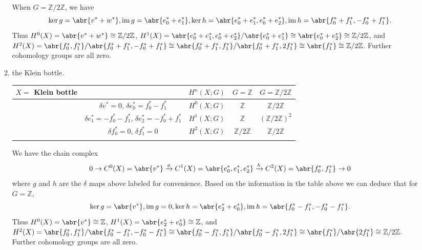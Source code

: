 \documentclass[11pt]{article}
\DeclareMathOperator{\im}{im}
\begin{document}
\begin{enumerate}
\begin{enumerate}
        When $G = \mathbb{Z}/2\mathbb{Z}$, we have \[\ker g = \abr{v^\ast + w^\ast}, \im g = \abr{e_0^\ast + e_1^\ast}, \ker h = \abr{e_0^\ast+e_1^\ast,e_0^\ast + e_2^\ast}, \im h = \abr{f_0^\ast+f_1^\ast,-f_0^\ast+f_1^\ast}.\] Thus $H^0(X) = \abr{v^\ast + w^\ast}\cong \mathbb{Z}/2\mathbb{Z}$, $H^1(X) = \abr{e_0^\ast+e_1^\ast,e_0^\ast + e_2^\ast}/\abr{e_0^\ast + e_1^\ast} \cong \abr{e_0^\ast + e_2^\ast}\cong \mathbb{Z}/2\mathbb{Z}$, and $H^2(X) = \abr{f_0^\ast, f_1^\ast}/\abr{f_0^\ast+f_1^\ast,-f_0^\ast+f_1^\ast} \cong \abr{f_0^\ast+f_1^\ast, f_1^\ast}/\abr{f_0^\ast+f_1^\ast,2f_1^\ast}\cong \abr{f_1^\ast}\cong \mathbb{Z}/2\mathbb{Z}$. Further cohomology groups are all zero.
      \item the Klein bottle.
      \begin{table}[h]
        \centering
        \begin{tabular}{cc|c|c|c}
          $X = $ Klein bottle\hspace*{3cm} & \hspace*{5cm} & $H^n(X;G)$ & $G = \mathbb{Z}$ & $G = \mathbb{Z}/2\mathbb{Z}$  \\ \hline
         & $\delta v^\ast= 0$, $\delta e_0^\ast= f_0^\ast-f_1^\ast$ & $H^0(X;G)$ & $\mathbb{Z}$ & $\mathbb{Z}/2\mathbb{Z}$  \\
         & $\delta e_1^\ast= -f_0^\ast-f_1^\ast$, $\delta e_2^\ast= -f_0^\ast+f_1^\ast$ & $H^1(X;G)$ & $\mathbb{Z}$ & $(\mathbb{Z}/2\mathbb{Z})^2$  \\
         & $\delta f_0^\ast= 0$, $\delta f_1^\ast= 0$ & $H^2(X;G)$ & $\mathbb{Z}/2\mathbb{Z}$ & $\mathbb{Z}/2\mathbb{Z}$ \\
         &
        \end{tabular}
        \end{table}

        We have the chain complex \[0\to C^0(X) = \abr{v^\ast}\xrightarrow{g}C^1(X) = \abr{e_0^\ast, e_1^\ast, e_2^\ast}\xrightarrow{h}C^2(X) =\abr{f_0^\ast, f_1^\ast}\to 0\] where $g$ and $h$ are the $\delta$ maps above labeled for convenience.
        Based on the information in the table above we can deduce that for $G =\mathbb{Z}$, \[\ker g = \abr{v^\ast}, \im g = 0, \ker h = \abr{e_2^\ast+e_0^\ast}, \im h = \abr{f_0^\ast-f_1^\ast, -f_0^\ast-f_1^\ast}.\] Thus $H^0(X) = \abr{v^\ast}\cong \mathbb{Z}$, $H^1(X) = \abr{e_2^\ast+e_0^\ast} \cong \mathbb{Z}$, and $H^2(X) = \abr{f_0^\ast, f_1^\ast}/\abr{f_0^\ast-f_1^\ast, -f_0^\ast-f_1^\ast} \cong \abr{f_0^\ast-f_1^\ast, f_1^\ast}/\abr{f_0^\ast-f_1^\ast,2f_1^\ast}\cong \abr{f_1^\ast}/\abr{2f_1^\ast}\cong \mathbb{Z}/2\mathbb{Z}$. Further cohomology groups are all zero.
        

\end{enumerate}
\end{enumerate}
\end{document}
